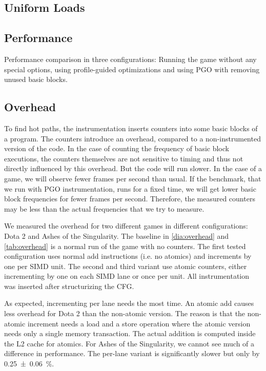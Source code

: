 

\subsection{Uniform Loads}
\label{sub:eval_uniform_loads}



\subsection{Performance}
\label{sub:eval_perf}
Performance comparison in three configurations: Running the game without any special options, using profile-guided optimizations and using PGO with removing unused basic blocks.



\subsection{Overhead}
\label{sub:overhead}
To find hot paths, the instrumentation inserts counters into some basic blocks of a program. The counters introduce an overhead, compared to a non-instrumented version of the code.
In the case of counting the frequency of basic block executions, the counters themselves are not sensitive to timing and thus not directly influenced by this overhead.
But the code will run slower. In the case of a game, we will observe fewer frames per second than usual.
If the benchmark, that we run with PGO instrumentation, runs for a fixed time, we will get lower basic block frequencies for fewer frames per second.
Therefore, the measured counters may be less than the actual frequencies that we try to measure.

We measured the overhead for two different games in different configurations: Dota 2 and Ashes of the Singularity. The baseline in \cref{dia:overhead} and \cref{tab:overhead} is a normal run of the game with no counters.
The first tested configuration uses normal add instructions (i.e. no atomics) and increments by one per SIMD unit.
The second and third variant use atomic counters, either incrementing by one on each SIMD lane or once per unit.
All instrumentation was inserted after structurizing the CFG.

As expected, incrementing per lane needs the most time. An atomic add causes less overhead for Dota 2 than the non-atomic version.
The reason is that the non-atomic increment needs a load and a store operation where the atomic version needs only a single memory transaction. The actual addition is computed inside the L2 cache for atomics.
For Ashes of the Singularity, we cannot see much of a difference in performance. The per-lane variant is significantly slower but only by \SI{0.25 \pm 0.06}{\percent}.

